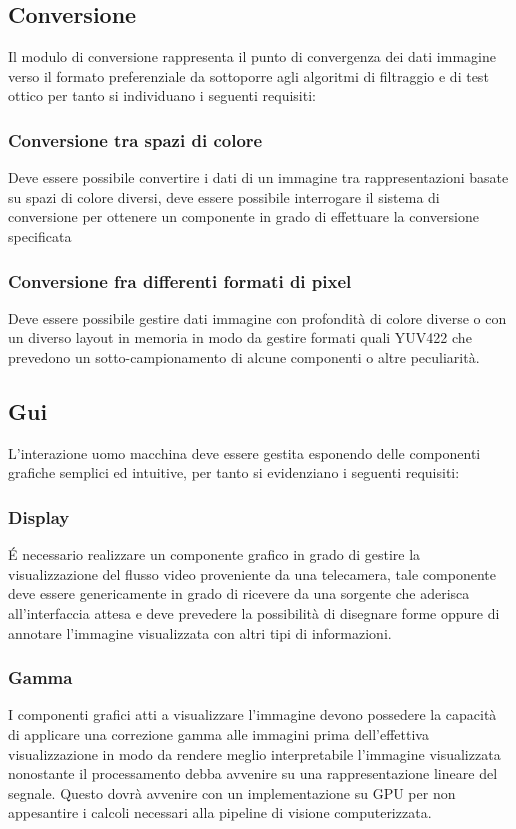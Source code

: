 \subsection{Conversione}
Il modulo di conversione rappresenta il punto di convergenza dei dati immagine verso il formato preferenziale da sottoporre agli algoritmi di filtraggio e di test ottico per tanto si individuano i seguenti requisiti:

\subsubsection{Conversione tra spazi di colore}
Deve essere possibile convertire i dati di un immagine tra rappresentazioni basate su spazi di colore diversi, deve essere possibile interrogare il sistema di conversione per ottenere un componente in grado di effettuare la conversione specificata

\subsubsection{Conversione fra differenti formati di pixel}
Deve essere possibile gestire dati immagine con profondità di colore diverse o con un diverso layout in memoria in modo da gestire formati quali YUV422 che prevedono un sotto-campionamento di alcune componenti o altre peculiarità.

\subsection{Gui}
L'interazione uomo macchina deve essere gestita esponendo delle componenti grafiche semplici ed intuitive, per tanto si evidenziano i seguenti requisiti:

\subsubsection{Display}
\'{E} necessario realizzare un componente grafico in grado di gestire la visualizzazione del flusso video proveniente da una telecamera, tale componente deve essere genericamente in grado di ricevere da una sorgente che aderisca all'interfaccia attesa e deve prevedere la possibilità di disegnare forme oppure di annotare l'immagine visualizzata con altri tipi di informazioni.

\subsubsection{Gamma}
I componenti grafici atti a visualizzare l'immagine devono possedere la capacità di applicare una correzione gamma alle immagini prima dell'effettiva visualizzazione in modo da rendere meglio interpretabile l'immagine visualizzata nonostante il processamento debba avvenire su una rappresentazione lineare del segnale. Questo dovrà avvenire con un implementazione su GPU per non appesantire i calcoli necessari alla pipeline di visione computerizzata.

